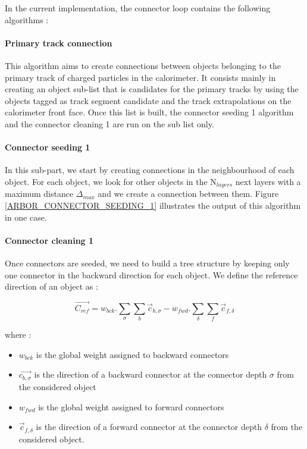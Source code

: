\documentclass[cits]{JINST}
\begin{document}
In the current implementation, the connector loop contains the following algorithms :

\paragraph*{Primary track connection} This algorithm aims to create connections between objects belonging to the primary track of charged particles in the calorimeter. It consists mainly in creating an object sub-list that is candidates for the primary tracks by using the objects tagged as track segment candidate and the track extrapolations on the calorimeter front face. Once this list is built, the connector seeding 1 algorithm and the connector cleaning 1 are run on the sub list only. 

\paragraph*{Connector seeding 1} In this sub-part, we start by creating connections in the neighbourhood of each object. For each object, we look for other objects in the N$_{layers}$ next layers with a maximum distance $\Delta_{max}$ and we create a connection between them. Figure \ref{ARBOR_CONNECTOR_SEEDING_1} illustrates the output of this algorithm in one case.

\paragraph*{Connector cleaning 1} Once connectors are seeded, we need to build a tree structure by keeping only one connector in the backward direction for each object. We define the reference direction of an object as :

\begin{equation}
  \vec{C_{ref}} = w_{bck} . \sum_\sigma \sum_b \vec{c}_{b,\sigma} - w_{fwd} . \sum_\delta \sum_f \vec{c}_{f,\delta}
\end{equation}

where :

\begin{itemize}
  \item $w_{bck}$ is the global weight assigned to backward connectors
  \item $\vec{c_{b,\sigma}}$ is the direction of a backward connector at the connector depth $\sigma$ from the considered object
  \item $w_{fwd}$ is the global weight assigned to forward connectors
  \item $\vec{c}_{f,\delta}$ is the direction of a forward connector at the connector depth $\delta$ from the considered object.
\end{itemize}
\end{document}
